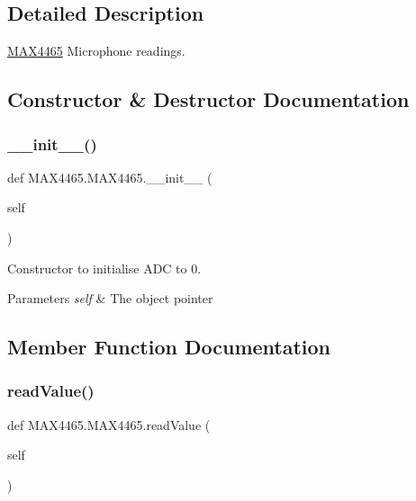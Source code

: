 \subsection{Detailed Description}
\mbox{\hyperlink{class_m_a_x4465_1_1_m_a_x4465}{M\+A\+X4465}} Microphone readings. 



\subsection{Constructor \& Destructor Documentation}
\mbox{\label{class_m_a_x4465_1_1_m_a_x4465_ac0254870231e3847e7196165da339454}} 
\subsubsection{\texorpdfstring{\+\_\+\+\_\+init\+\_\+\+\_\+()}{\_\_init\_\_()}}
{\footnotesize\ttfamily def M\+A\+X4465.\+M\+A\+X4465.\+\_\+\+\_\+init\+\_\+\+\_\+ (\begin{DoxyParamCaption}\item[{}]{self }\end{DoxyParamCaption})}



Constructor to initialise A\+DC to 0. 


\begin{DoxyParams}{Parameters}
{\em self} & The object pointer \\
\hline
\end{DoxyParams}


\subsection{Member Function Documentation}
\mbox{\label{class_m_a_x4465_1_1_m_a_x4465_a4c2fdc1d03b59856b1767625ae559f4e}} 
\subsubsection{\texorpdfstring{read\+Value()}{readValue()}}
{\footnotesize\ttfamily def M\+A\+X4465.\+M\+A\+X4465.\+read\+Value (\begin{DoxyParamCaption}\item[{}]{self }\end{DoxyParamCaption})}



